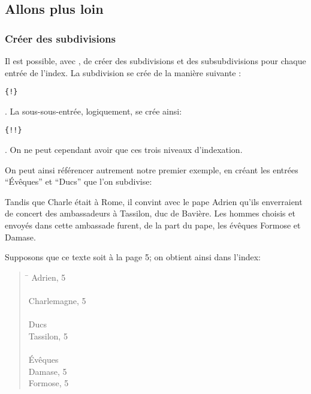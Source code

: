 \subsection{Allons plus loin}
\subsubsection{Créer des subdivisions}

Il est possible, avec ,  de créer des subdivisions et des subsubdivisions  pour chaque entrée de l'index. La subdivision se crée de la manière suivante : \begin{english}\verb|{|\verb|!|\verb|}|\end{english}. La sous-sous-entrée, logiquement, se crée ainsi: \begin{english}\verb|{|\verb|!|\verb|!|\verb|}|\end{english}. On ne peut cependant avoir que ces trois niveaux d'indexation.

On peut ainsi référencer autrement notre premier exemple, en créant les entrées \enquote{Évêques} et \enquote{Ducs} que l'on subdivise:

\begin{latexcode}
Tandis que Charle était à Rome, il convint 
avec le pape Adrien qu’ils enverraient de concert 
des ambassadeurs à Tassilon, duc de Bavière.
\textelp{}
Les hommes choisis et envoyés dans cette ambassade furent, de la 
part du pape, les évêques Formose
et Damase\textelp{}.
\end{latexcode}


Supposons que ce texte soit à la page 5; on obtient ainsi dans l'index:
\begin{quotation}
\begin{tabbing}
\hspace{0,5cm}  \= \kill
Adrien, 5 \\
\\
Charlemagne, 5 \\
\\
Ducs \\
\> Tassilon, 5\\
\\
Évêques \\
\> Damase, 5\\
\> Formose, 5
\end{tabbing}
\end{quotation}



